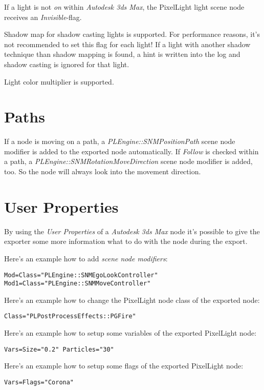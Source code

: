 If a light is not \emph{on} within \emph{Autodesk 3ds Max}, the PixelLight light scene node receives an \emph{Invisible}-flag.

Shadow map for shadow casting lights is supported. For performance reasons, it's not recommended to set this flag for each light! If a light with another shadow technique than shadow mapping is found, a hint is written into the log and shadow casting is ignored for that light.

Light color multiplier is supported.




\section{Paths}
If a node is moving on a path, a \emph{PLEngine::SNMPositionPath} scene node modifier is added to the exported node automatically. If \emph{Follow} is checked within a path, a \emph{PLEngine::SNMRotationMoveDirection} scene node modifier is added, too. So the node will always look into the movement direction.





\section{User Properties}
By using the \emph{User Properties} of a \emph{Autodesk 3ds Max} node it's possible to give the exporter some more information what to do with the node during the export.

Here's an example how to add \emph{scene node modifiers}:

\begin{lstlisting}[caption=Multiple scene node modifiers]
Mod=Class="PLEngine::SNMEgoLookController"
Mod1=Class="PLEngine::SNMMoveController"
\end{lstlisting}

Here's an example how to change the PixelLight node class of the exported node:

\begin{lstlisting}[caption=Setting the scene node class]
Class="PLPostProcessEffects::PGFire"
\end{lstlisting}

Here's an example how to setup some variables of the exported PixelLight node:

\begin{lstlisting}[caption=Setting scene node variables]
Vars=Size="0.2" Particles="30"
\end{lstlisting}

Here's an example how to setup some flags of the exported PixelLight node:

\begin{lstlisting}[caption=Setting scene node flags]
Vars=Flags="Corona"
\end{lstlisting}
